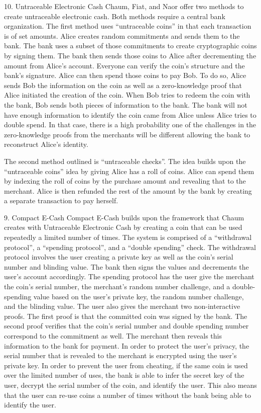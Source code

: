 10. Untraceable Electronic Cash
Chaum, Fiat, and Naor offer two methods to create untraceable electronic cash.  Both methods require a central bank organization.  The first method uses “untraceable coins” in that each transaction is of set amounts.  Alice creates random commitments and sends them to the bank.  The bank uses a subset of those commitments to create cryptographic coins by signing them.  The bank then sends those coins to Alice after decrementing the amount from Alice’s account.  Everyone can verify the coin’s structure and the bank’s signature. Alice can then spend those coins to pay Bob.  To do so, Alice sends Bob the information on the coin as well as a zero-knowledge proof that Alice initiated the creation of the coin.  When Bob tries to redeem the coin with the bank, Bob sends both pieces of information to the bank.  The bank will not have enough information to identify the coin came from Alice unless Alice tries to double spend.  In that case, there is a high probability one of the challenges in the zero-knowledge proofs from the merchants will be different allowing the bank to reconstruct Alice’s identity.

The second method outlined is “untraceable checks”.  The idea builds upon the “untraceable coins” idea by giving Alice has a roll of coins.  Alice can spend them by indexing the roll of coins by the purchase amount and revealing that to the merchant.  Alice is then refunded the rest of the amount by the bank by creating a separate transaction to pay herself.

9. Compact E-Cash
Compact E-Cash builds upon the framework that Chaum creates with Untraceable Electronic Cash by creating a coin that can be used repeatedly a limited number of times.  The system is comprised of a “withdrawal protocol”, a “spending protocol”, and a “double spending” check.  The withdrawal protocol involves the user creating a private key as well as the coin’s serial number and blinding value.  The bank then signs the values and decrements the user’s account accordingly.  The spending protocol has the user give the merchant the coin’s serial number, the merchant’s random number challenge, and a double-spending value based on the user’s private key, the random number challenge, and the blinding value.  The user also gives the merchant two non-interactive proofs.  The first proof is that the committed coin was signed by the bank.  The second proof verifies that the coin’s serial number and double spending number correspond to the commitment as well.  The merchant then reveals this information to the bank for payment.  In order to protect the user’s privacy, the serial number that is revealed to the merchant is encrypted using the user’s private key.  In order to prevent the user from cheating, if the same coin is used over the limited number of uses, the bank is able to infer the secret key of the user, decrypt the serial number of the coin, and identify the user.  This also means that the user can re-use coins a number of times without the bank being able to identify the user.
 
